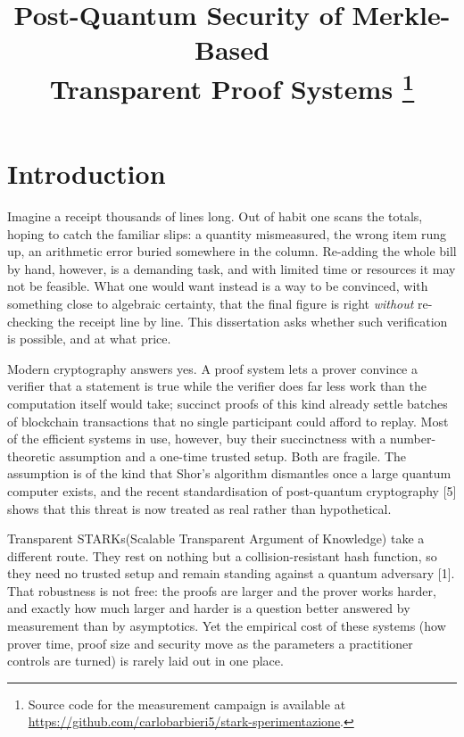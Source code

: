 \documentclass[11pt]{article}
\title{\vspace{-1.5em}Post-Quantum Security of Merkle-Based\\Transparent Proof Systems%
\thanks{Source code for the measurement campaign is available at
\url{https://github.com/carlobarbieri5/stark-sperimentazione}.}}
\author{}
\date{}
\begin{document}
\maketitle
\vspace{-2em}

\section{Introduction}
\label{sec:intro}

Imagine a receipt thousands of lines long. Out of habit one scans the totals, hoping to catch the
familiar slips: a quantity mismeasured, the wrong item rung up, an arithmetic error buried somewhere in
the column. Re-adding the whole bill by hand, however, is a demanding task, and with limited time or resources it may not be feasible. What one would want instead is a way to be convinced, with something
close to algebraic certainty, that the final figure is right \emph{without} re-checking the receipt line
by line. This dissertation asks whether such verification is possible, and at what price.

Modern cryptography answers yes. A proof system lets a prover convince a verifier that a statement is
true while the verifier does far less work than the computation itself would take; succinct proofs of
this kind already settle batches of blockchain transactions that no single participant could afford to
replay. Most of the efficient systems in use, however, buy their succinctness with a number-theoretic
assumption and a one-time trusted setup. Both are fragile. The assumption is of the kind that
Shor's algorithm dismantles once a large quantum computer exists, and the recent standardisation of
post-quantum cryptography [5] shows that this threat is now treated as real rather than hypothetical.

Transparent STARKs(Scalable Transparent Argument of Knowledge) take a different route. They rest on nothing but a collision-resistant hash function,
so they need no trusted setup and remain standing against a quantum adversary [1]. That robustness is
not free: the proofs are larger and the prover works harder, and exactly how much larger and harder is a
question better answered by measurement than by asymptotics. Yet the empirical cost of these systems
(how prover time, proof size and security move as the parameters a practitioner controls are turned)
is rarely laid out in one place.
\end{document}
